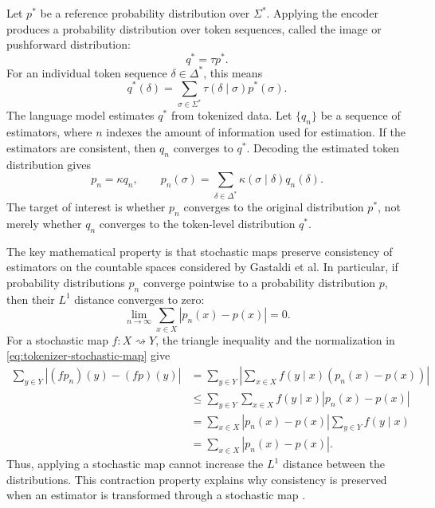Let \(p^*\) be a reference probability distribution over \(\Sigma^*\). Applying the encoder produces a probability distribution over token sequences, called the image or pushforward distribution:
\begin{equation}
    q^*=\tau p^*.
    \label{eq:tokenizer-pushforward}
\end{equation}
For an individual token sequence \(\delta\in\Delta^*\), this means
\begin{equation}
    q^*(\delta)
    =
    \sum_{\sigma\in\Sigma^*}
    \tau(\delta\mid\sigma)p^*(\sigma).
    \label{eq:tokenizer-pushforward-pointwise}
\end{equation}
The language model estimates \(q^*\) from tokenized data. Let \(\{q_n\}\) be a sequence of estimators, where \(n\) indexes the amount of information used for estimation. If the estimators are consistent, then \(q_n\) converges to \(q^*\). Decoding the estimated token distribution gives
\begin{equation}
    p_n=\kappa q_n,
    \qquad
    p_n(\sigma)
    =
    \sum_{\delta\in\Delta^*}
    \kappa(\sigma\mid\delta)q_n(\delta).
    \label{eq:tokenizer-decoded-estimator}
\end{equation}
The target of interest is whether \(p_n\) converges to the original distribution \(p^*\), not merely whether \(q_n\) converges to the token-level distribution \(q^*\).

The key mathematical property is that stochastic maps preserve consistency of estimators on the countable spaces considered by Gastaldi et al. In particular, if probability distributions \(p_n\) converge pointwise to a probability distribution \(p\), then their \(L^1\) distance converges to zero:
\begin{equation}
    \lim_{n\to\infty}
    \sum_{x\in X}|p_n(x)-p(x)|=0.
    \label{eq:tokenizer-l1-convergence}
\end{equation}
For a stochastic map \(f:X\rightsquigarrow Y\), the triangle inequality and the normalization in \cref{eq:tokenizer-stochastic-map} give
\begin{align}
    \sum_{y\in Y}|(fp_n)(y)-(fp)(y)|
    &=
    \sum_{y\in Y}
    \left|
        \sum_{x\in X}f(y\mid x)(p_n(x)-p(x))
    \right|
    \nonumber\\
    &\leq
    \sum_{y\in Y}\sum_{x\in X}
    f(y\mid x)|p_n(x)-p(x)|
    \nonumber\\
    &=
    \sum_{x\in X}|p_n(x)-p(x)|
    \sum_{y\in Y}f(y\mid x)
    \nonumber\\
    &=
    \sum_{x\in X}|p_n(x)-p(x)|.
    \label{eq:tokenizer-stochastic-contraction}
\end{align}
Thus, applying a stochastic map cannot increase the \(L^1\) distance between the distributions. This contraction property explains why consistency is preserved when an estimator is transformed through a stochastic map \parencite{gastaldi2025foundations}.


